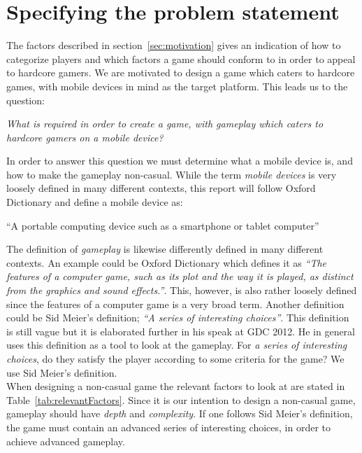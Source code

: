 \section{Specifying the problem statement}
\label{sec:specifyingtheproblemstatemen}

The factors described in section~\ref{sec:motivation} gives an indication of
how to categorize players and which factors a game should conform to in order
to appeal to hardcore gamers.
We are motivated to design a game which caters to hardcore games, with mobile devices in mind as the target platform.
This leads us to the question:
\begin{center}
\textit{What is required in order to create a game, with gameplay which caters to hardcore gamers on a mobile device?}
\end{center}

In order to answer this question we must determine what a mobile device is, and how to make the gameplay non-casual.
While the term \textit{mobile devices} is very loosely defined in many different contexts, this report will follow Oxford Dictionary and define a mobile device as:
\begin{center}
``A portable computing device such as a smartphone or tablet computer''\cite{mobileOx}
\end{center}

The definition of \textit{gameplay} is likewise differently defined in many different contexts. 
An example could be Oxford Dictionary which defines it as \textit{``The features of a computer game, such as its plot and the way it is played, as distinct from the graphics and sound effects.''}\cite{gameplayOx}. This, however, is also rather loosely defined since the features of a computer game is a very broad term.
Another definition could be Sid Meier's definition; \textit{``A series of interesting choices''}\cite{GDC2012}.
This definition is still vague but it is elaborated further in his speak at GDC 2012.\cite{GDC2012}
He in general uses this definition as a tool to look at the gameplay.
For \textit{a series of interesting choices}, do they satisfy the player according to some criteria for the game?
We use Sid Meier's definition.\\

When designing a non-casual game the relevant factors to look at are stated in Table~\ref{tab:relevantFactors}.
Since it is our intention to design a non-casual game, gameplay should have \textit{depth} and \textit{complexity}.
If one follows Sid Meier's definition, the game must contain an advanced series of interesting choices, in order to achieve advanced gameplay.

